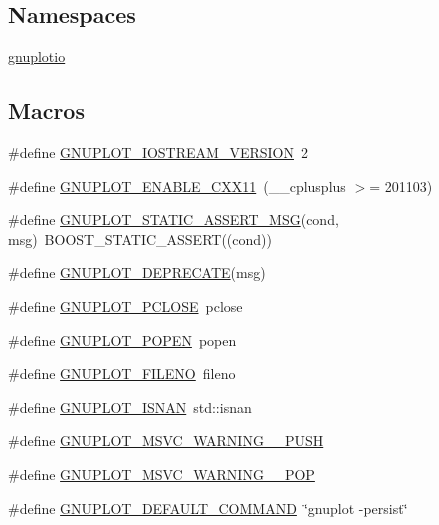 \subsection*{Namespaces}
\begin{DoxyCompactItemize}
\item 
 \hyperlink{namespacegnuplotio}{gnuplotio}
\end{DoxyCompactItemize}
\subsection*{Macros}
\begin{DoxyCompactItemize}
\item 
\#define \hyperlink{gnuplot-iostream_8h_ab3ce4a7287aefeb9af2345e08cb2d5c6}{G\+N\+U\+P\+L\+O\+T\+\_\+\+I\+O\+S\+T\+R\+E\+A\+M\+\_\+\+V\+E\+R\+S\+I\+ON}~2
\item 
\#define \hyperlink{gnuplot-iostream_8h_aff01a99842ed9eb01a166d4bf19543c9}{G\+N\+U\+P\+L\+O\+T\+\_\+\+E\+N\+A\+B\+L\+E\+\_\+\+C\+X\+X11}~(\+\_\+\+\_\+cplusplus $>$= 201103)
\item 
\#define \hyperlink{gnuplot-iostream_8h_a763d85d6a998475c41e5bea11e6f0a16}{G\+N\+U\+P\+L\+O\+T\+\_\+\+S\+T\+A\+T\+I\+C\+\_\+\+A\+S\+S\+E\+R\+T\+\_\+\+M\+SG}(cond,  msg)~B\+O\+O\+S\+T\+\_\+\+S\+T\+A\+T\+I\+C\+\_\+\+A\+S\+S\+E\+RT((cond))
\item 
\#define \hyperlink{gnuplot-iostream_8h_aceaee9cbe0b7786c1ee8aa2e8b79ed1a}{G\+N\+U\+P\+L\+O\+T\+\_\+\+D\+E\+P\+R\+E\+C\+A\+TE}(msg)
\item 
\#define \hyperlink{gnuplot-iostream_8h_aed027791e656970e6de95b047dc375b1}{G\+N\+U\+P\+L\+O\+T\+\_\+\+P\+C\+L\+O\+SE}~pclose
\item 
\#define \hyperlink{gnuplot-iostream_8h_a92922430eb3df3ace3b18c75b91a0ab8}{G\+N\+U\+P\+L\+O\+T\+\_\+\+P\+O\+P\+EN}~popen
\item 
\#define \hyperlink{gnuplot-iostream_8h_abcc0f8f4d67f147c013bb33b55dc3a16}{G\+N\+U\+P\+L\+O\+T\+\_\+\+F\+I\+L\+E\+NO}~fileno
\item 
\#define \hyperlink{gnuplot-iostream_8h_ac10f83c29b94951000138a0ab2054956}{G\+N\+U\+P\+L\+O\+T\+\_\+\+I\+S\+N\+AN}~std\+::isnan
\item 
\#define \hyperlink{gnuplot-iostream_8h_aef2d72925bdeb9f505df49edbf7579bf}{G\+N\+U\+P\+L\+O\+T\+\_\+\+M\+S\+V\+C\+\_\+\+W\+A\+R\+N\+I\+N\+G\+\_\+\_\+\+P\+U\+SH}
\item 
\#define \hyperlink{gnuplot-iostream_8h_a4429193ca854af851cec4220c2d9102e}{G\+N\+U\+P\+L\+O\+T\+\_\+\+M\+S\+V\+C\+\_\+\+W\+A\+R\+N\+I\+N\+G\+\_\+\_\+\+P\+OP}
\item 
\#define \hyperlink{gnuplot-iostream_8h_afe4b1cc99e87d3bb8bbb07280db4b697}{G\+N\+U\+P\+L\+O\+T\+\_\+\+D\+E\+F\+A\+U\+L\+T\+\_\+\+C\+O\+M\+M\+A\+ND}~\char`\"{}gnuplot -\/persist\char`\"{}
\end{DoxyCompactItemize}
